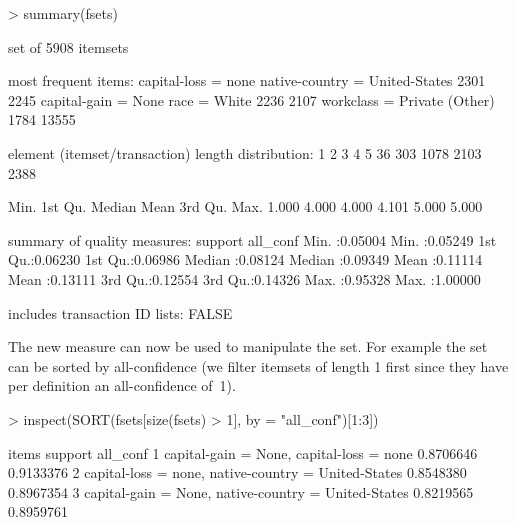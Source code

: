 \documentclass[10pt,a4paper]{article}
\begin{document}
\begin{Schunk}
\begin{Sinput}
> summary(fsets)
\end{Sinput}
\begin{Soutput}
set of 5908 itemsets

most frequent items:
           capital-loss = none native-country = United-States 
                          2301                           2245 
           capital-gain = None                   race = White 
                          2236                           2107 
           workclass = Private                        (Other) 
                          1784                          13555 

element (itemset/transaction) length distribution:
   1    2    3    4    5 
  36  303 1078 2103 2388 

   Min. 1st Qu.  Median    Mean 3rd Qu.    Max. 
  1.000   4.000   4.000   4.101   5.000   5.000 

summary of quality measures:
    support           all_conf      
 Min.   :0.05004   Min.   :0.05249  
 1st Qu.:0.06230   1st Qu.:0.06986  
 Median :0.08124   Median :0.09349  
 Mean   :0.11114   Mean   :0.13111  
 3rd Qu.:0.12554   3rd Qu.:0.14326  
 Max.   :0.95328   Max.   :1.00000  

includes transaction ID lists: FALSE 

\end{Soutput}
\end{Schunk}

The new measure 
can now be used to manipulate the set.  For
example the set can be sorted by all-confidence (we filter itemsets
of length 1 first since they have per definition an all-confidence of~1).

\begin{Schunk}
\begin{Sinput}
> inspect(SORT(fsets[size(fsets) > 1], by = "all_conf")[1:3])
\end{Sinput}
\begin{Soutput}
  items                              support  all_conf
1 {capital-gain = None,                               
   capital-loss = none}            0.8706646 0.9133376
2 {capital-loss = none,                               
   native-country = United-States} 0.8548380 0.8967354
3 {capital-gain = None,                               
   native-country = United-States} 0.8219565 0.8959761

\end{Soutput}
\end{Schunk}
\end{document}
